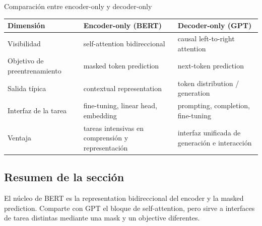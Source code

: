 \begin{importantbox}{Comparación entre encoder-only y decoder-only}
\begin{tabular}{L{0.18\textwidth} L{0.36\textwidth} L{0.36\textwidth}}
\toprule
Dimensión & Encoder-only (BERT) & Decoder-only (GPT) \\
\midrule
Visibilidad & self-attention bidireccional & causal left-to-right attention \\
Objetivo de preentrenamiento & masked token prediction & next-token prediction \\
Salida típica & contextual representation & token distribution / generation \\
Interfaz de la tarea & fine-tuning, linear head, embedding & prompting, completion, fine-tuning \\
Ventaja & tareas intensivas en comprensión y representación & interfaz unificada de generación e interacción \\
\bottomrule
\end{tabular}
\end{importantbox}


\subsection{Resumen de la sección}

El núcleo de BERT es la representation bidireccional del encoder y la masked prediction. Comparte con GPT el bloque de self-attention, pero sirve a interfaces de tarea distintas mediante una mask y un objective diferentes.
